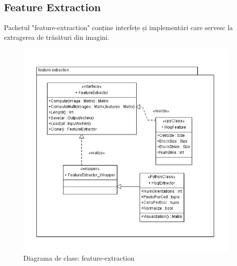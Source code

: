 \subsection{Feature Extraction}
Pachetul "feature-extraction" conține interfețe și implementări care servesc la extragerea de trăsături din imagini.
\begin{figure}[H]
	\centering
		\includegraphics[width=1.00\textwidth]{uml/featureextractionClassDiagram.png}
	\caption{Diagrama de clase: feature-extraction}
	\label{fig:featureextractionClassDiagram}
\end{figure}

\pagebreak
